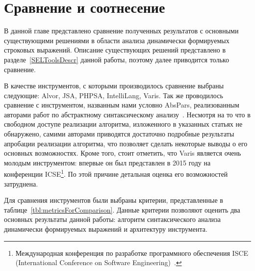 \chapter{Сравнение и соотнесение} \label{chaptComp}

В данной главе представлено сравнение полученных результатов с основными существующими решениями в области анализа динамически формируемых строковых выражений. Описание существующих решений представлено 
в разделе~\ref{SELToolsDescr} данной работы, поэтому далее приводится только сравнение.

В качестве инструментов, с которыми производилось сравнение выбраны следующие: Alvor, JSA, PHPSA, IntelliLang, Varis. Так же проводилось сравнение с инструментом, названным нами 
условно AbsPars, реализованным авторами работ по абстрактному синтаксическому анализу~\cite{LrAbstract1, LrAbstract2, LRAbstractParsingSema}. Несмотря на то что в свободном доступе реализации 
алгоритма, изложенного в указанных статьях не обнаружено, самими авторами приводятся достаточно подробные результаты апробации реализации алгоритма, что позволяет сделать некоторые выводы о его 
основных возможностях. Кроме того, стоит отметить, что Varis является очень молодым инструментом: впервые он был представлен в 2015 году на конференции ICSE\footnote{Международная конференция по 
разработке программного обеспечения ISCE (International Conference on Software Engineering)~\cite{ICSE}.}. По этой причине детальная оценка его возможностей затруднена. 

Для сравнения инструментов были выбраны критерии, представленные в таблице~\ref{tbl:metricsForComparison}. Данные критерии позволяют оценить два основных результаты данной работы: алгоритм синтаксического анализа динамически 
формируемых выражений и архитектуру инструмента. 

